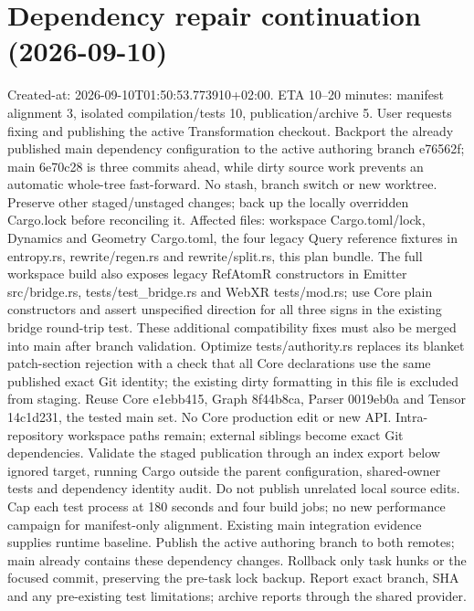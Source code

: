 \documentclass[11pt]{article}
\begin{document}
\section{Dependency repair continuation (2026-09-10)}
Created-at: 2026-09-10T01:50:53.773910+02:00. ETA 10--20 minutes:
manifest alignment 3, isolated compilation/tests 10, publication/archive 5.
User requests fixing and publishing the active Transformation checkout. Backport the
already published main dependency configuration to the active authoring branch e76562f;
main 6e70c28 is three commits ahead, while dirty source work prevents an automatic
whole-tree fast-forward. No stash, branch switch or new worktree. Preserve other
staged/unstaged changes; back up the locally overridden Cargo.lock before reconciling it.
Affected files: workspace Cargo.toml/lock, Dynamics and Geometry Cargo.toml, the four
legacy Query reference fixtures in entropy.rs, rewrite/regen.rs and rewrite/split.rs,
this plan bundle. The full workspace build also exposes legacy RefAtomR
constructors in Emitter src/bridge.rs, tests/test\_bridge.rs and WebXR
tests/mod.rs; use Core plain constructors and assert unspecified direction
for all three signs in the existing bridge round-trip test. These additional
compatibility fixes must also be merged into main after branch validation.
Optimize tests/authority.rs replaces its blanket patch-section rejection with
a check that all Core declarations use the same published exact Git identity;
the existing dirty formatting in this file is excluded from staging. Reuse Core e1ebb415, Graph 8f44b8ca, Parser 0019eb0a and Tensor
14c1d231, the tested main set. No Core production edit or new API. Intra-repository
workspace paths remain; external siblings become exact Git dependencies.
Validate the staged publication through an index export below ignored target, running
Cargo outside the parent configuration, shared-owner tests and dependency identity audit.
Do not publish unrelated local source edits. Cap each test process at 180 seconds and
four build jobs; no new performance campaign for manifest-only alignment. Existing
main integration evidence supplies runtime baseline. Publish the active authoring branch
to both remotes; main already contains these dependency changes. Rollback only task
hunks or the focused commit, preserving the pre-task lock backup. Report exact branch,
SHA and any pre-existing test limitations; archive reports through the shared provider.
\end{document}
